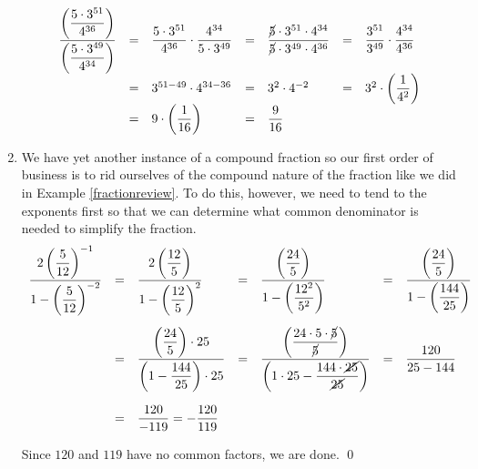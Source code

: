 \documentclass{ximera}
\begin{document}
\begin{example}
\begin{enumerate}
\[\begin{array}{rclclcl}
\dfrac{\left(\dfrac{5\cdot 3^{51}}{4^{36}}\right)}{\left(\dfrac{5 \cdot 3^{49}}{4^{34}}\right)} & = & \dfrac{5\cdot 3^{51}}{4^{36}} \cdot \dfrac{4^{34}}{5 \cdot 3^{49}} & = & \dfrac{\cancel{5} \cdot 3^{51} \cdot 4^{34}}{\cancel{5} \cdot 3^{49} \cdot 4^{36}} & = & \dfrac{3^{51}}{3^{49}} \cdot\dfrac{4^{34}}{4^{36}} \\

& = & 3^{51-49} \cdot 4^{34-36} & = & 3^{2} \cdot 4^{-2} & = & 3^{2} \cdot \left( \dfrac{1}{4^2}\right) \\

& = & 9 \cdot \left(\dfrac{1}{16} \right) & = & \dfrac{9}{16} & & \\ \end{array} \]

\item We have yet another instance of a compound fraction so our first order of business is to rid ourselves of the compound nature of the fraction like we did in Example \ref{fractionreview}.  To do this, however, we need to tend to the exponents first so that we can determine what common denominator is needed to simplify the fraction.\[ \begin{array}{rclclcl} \dfrac{2 \left(\dfrac{5}{12}\right)^{-1}}{1 - \left(\dfrac{5}{12}\right)^{-2}} & = & \dfrac{2 \left(\dfrac{12}{5}\right)}{1 - \left(\dfrac{12}{5}\right)^{2}} & = & \dfrac{\left(\dfrac{24}{5}\right)}{1 - \left(\dfrac{12^2}{5^2}\right)} & = & \dfrac{\left(\dfrac{24}{5}\right)}{1 - \left(\dfrac{144}{25}\right)} \\ [30pt]

& = & \dfrac{\left(\dfrac{24}{5}\right) \cdot 25}{\left(1 - \dfrac{144}{25}\right)\cdot 25} & = & \dfrac{\left(\dfrac{24\cdot 5 \cdot \cancel{5}}{\cancel{5}}\right)}{\left(1 \cdot 25 - \dfrac{144 \cdot \cancel{25}}{\cancel{25}}\right)} & = & \dfrac{120}{25-144} \\ [30pt]
& = & \dfrac{120}{-119} = -\dfrac{120}{119} & & & & \\  \end{array} \]

Since $120$ and $119$ have no common factors, we are done.  \qed

\end{enumerate}

\end{example}

\medskip
\end{document}
